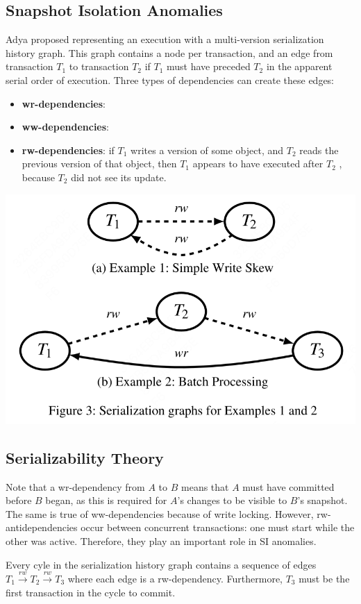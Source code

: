 \documentclass[11pt]{article}
\begin{document}
\subsection{Snapshot Isolation Anomalies}
\label{sec:org5656b3a}
Adya proposed representing an execution with a multi-version serialization history graph. This graph
contains a node per transaction, and an edge from transaction \(T_1\) to transaction \(T_2\) if
\(T_1\) must have preceded \(T_2\) in the apparent serial order of execution. Three types of
dependencies can create these edges:
\begin{itemize}
\item \textbf{wr-dependencies}:
\item \textbf{ww-dependencies}:
\item \textbf{rw-dependencies}: if \(T_1\) writes a version of some object, and \(T_2\) reads the previous version
of that object, then \(T_1\) appears to have executed after \(T_2\) , because \(T_2\) did not see its update.
\end{itemize}


\begin{center}
\includegraphics[width=.5\textwidth]{../../images/papers/75.png}
\label{3}
\end{center}
\subsection{Serializability Theory}
\label{sec:org2869fc2}
Note that a wr-dependency from \(A\) to \(B\) means that \(A\) must have committed before  \(B\)
began, as this is required for \(A\)’s changes to be visible to \(B\)’s snapshot. The same is true of
ww-dependencies because of write locking. However, rw-antidependencies occur between concurrent
transactions: one must start while the other was active. Therefore, they play an important role in SI
anomalies.

\begin{theorem}[]
\label{thm1}
Every cyle in the serialization history graph contains a sequence of edges
\(T_1\xrightarrow{rw}T_2\xrightarrow{rw}T_3\) where each edge is a rw-dependency. Furthermore, \(T_3\)
must be the first transaction in the cycle to commit.
\end{theorem}
\end{document}
